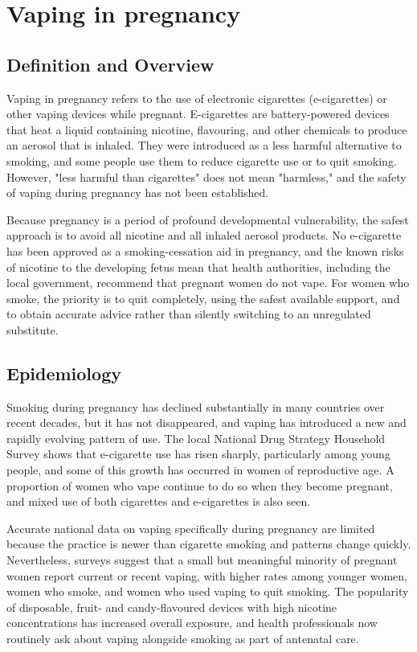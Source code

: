 \chapter{Vaping in pregnancy}

\section*{Definition and Overview}
Vaping in pregnancy refers to the use of electronic cigarettes (e-cigarettes) or other vaping devices while pregnant. E-cigarettes are battery-powered devices that heat a liquid containing nicotine, flavouring, and other chemicals to produce an aerosol that is inhaled. They were introduced as a less harmful alternative to smoking, and some people use them to reduce cigarette use or to quit smoking. However, "less harmful than cigarettes" does not mean "harmless," and the safety of vaping during pregnancy has not been established.

Because pregnancy is a period of profound developmental vulnerability, the safest approach is to avoid all nicotine and all inhaled aerosol products. No e-cigarette has been approved as a smoking-cessation aid in pregnancy, and the known risks of nicotine to the developing fetus mean that health authorities, including the local government, recommend that pregnant women do not vape. For women who smoke, the priority is to quit completely, using the safest available support, and to obtain accurate advice rather than silently switching to an unregulated substitute.

\section*{Epidemiology}
Smoking during pregnancy has declined substantially in many countries over recent decades, but it has not disappeared, and vaping has introduced a new and rapidly evolving pattern of use. The local National Drug Strategy Household Survey shows that e-cigarette use has risen sharply, particularly among young people, and some of this growth has occurred in women of reproductive age. A proportion of women who vape continue to do so when they become pregnant, and mixed use of both cigarettes and e-cigarettes is also seen.

Accurate national data on vaping specifically during pregnancy are limited because the practice is newer than cigarette smoking and patterns change quickly. Nevertheless, surveys suggest that a small but meaningful minority of pregnant women report current or recent vaping, with higher rates among younger women, women who smoke, and women who used vaping to quit smoking. The popularity of disposable, fruit- and candy-flavoured devices with high nicotine concentrations has increased overall exposure, and health professionals now routinely ask about vaping alongside smoking as part of antenatal care.

